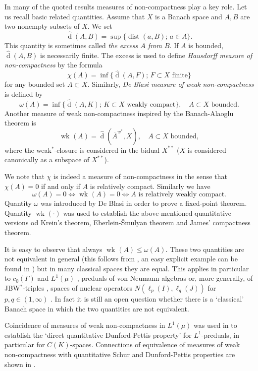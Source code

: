 \documentclass{amsart}
\numberwithin{equation}{section}
\theoremstyle{definition}
\def\dist{\operatorname{dist}}
\def\iff{\Longleftrightarrow}
\def\dh{\widehat{\operatorname{d}}}
\newcommand{\wk}[2][]{\operatorname{wk}_{#1}\left(#2\right)}
\newcommand{\wscl}[1]{\overline{#1}^{w^*}}
\newcommand{\setsep}{;\,}
\begin{document}
In many of the quoted results measures of non-compactness play a key role. Let us recall basic related quantities. Assume that $X$ is a Banach space and $A,B$ are two nonempty subsets of $X$. We set
$$\dh(A,B)=\sup\{\dist(a,B)\setsep a\in A\}.$$
This quantity is sometimes called \emph{the excess $A$ from $B$}. If $A$ is bounded, $\dh(A,B)$ is necessarily finite. The excess is used to define \emph{Hausdorff measure of non-compactness} by the formula
$$\chi(A)=\inf\{\dh(A,F)\setsep F\subset X\mbox{ finite}\}$$
for any bounded set $A\subset X$. Similarly, \emph{De Blasi measure of weak non-compactness} is defined by
$$\omega(A)=\inf\{\dh(A,K)\setsep K\subset X\mbox{ weakly compact}\},\quad A\subset X\mbox{ bounded}.$$
Another measure of weak non-compactness inspired by the Banach-Alaoglu theorem is
$$\wk{A}=\dh(\wscl{A},X),\quad A\subset X\mbox{ bounded},$$
where the weak$^*$-closure is considered in the bidual $X^{**}$ ($X$ is considered canonically as a subspace of $X^{**}$).

We note that $\chi$ is indeed a measure of non-compactness in the sense that $\chi(A)=0$ if and only if $A$ is relatively compact. Similarly we have
$$\omega(A)=0 \iff \wk{A}=0 \iff A\mbox{ is relatively weakly compact}.$$
Quantity $\omega$ was introduced by De Blasi \cite{deblasi} in order to prove a fixed-point theorem. Quantity $\wk{\cdot}$ was used to establish the above-mentioned quantitative versions od Krein's theorem, Eberlein-\v{S}mulyan theorem and James' compactness theorem.

It is easy to observe that always $\wk{A}\le \omega(A)$. These two quantities are not equivalent in general (this follows from \cite[Corollary 3.4 and Theorem 2.3]{AC-meas}, an easy explicit example can be found in \cite[Example 10.1]{qdpp}) but in many classical spaces they are equal. This applies in particular to $c_0(\Gamma)$ and $L^1(\mu)$ \cite[Proposition 10.2 and Theorem 7.5]{qdpp}, preduals of von Neumann algebras or, more generally, of JBW$^*$-triples \cite{mwnc}, spaces of nuclear operators $N(\ell_p(I),\ell_q(J))$ for $p,q\in(1,\infty)$ \cite{HK-nuclear}. In fact it is still an open question whether there is a `classical' Banach space in which the two quantities are not equivalent.

Coincidence of measures of weak non-compactness in $L^1(\mu)$ was used in \cite[Theorem 8.1]{qdpp} to establish the `direct quantitative Dunford-Pettis property' for $L^1$-preduals, in particular for $C(K)$-spaces. Connections of equivalence of measures of weak non-compactness with quantitative Schur and Dunford-Pettis properties are shown in \cite[Theorem 2.1]{qschur-dp}. 
\end{document}

